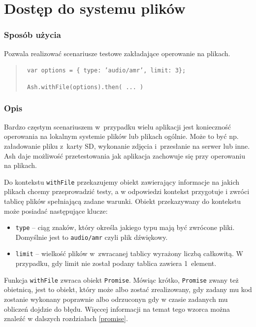 \documentclass[brudnopis]{xmgr}
\begin{document}
\section{Dostęp do systemu plików}

\subsubsection{Sposób użycia}
Pozwala realizować scenariusze testowe zakładające operowanie na plikach.

\begin{quote}
  \texttt{  var options = \{ type: 'audio/amr', limit: 3\};  }

  \texttt{  Ash.withFile(options).then( ... )  }
\end{quote}

\subsubsection{Opis}

Bardzo częstym scenariuszem w~przypadku wielu aplikacji jest konieczność operowania na lokalnym systemie plików lub plikach ogólnie. Może to być np. załadowanie pliku z~karty SD, wykonanie zdjęcia i~przesłanie na serwer lub inne. Ash daje możliwość przetestowania jak aplikacja zachowuje się przy operowaniu na plikach.  

Do kontekstu \texttt{withFile} przekazujemy obiekt zawierający informacje na jakich plikach chcemy przeprowadzić testy, a w odpowiedzi kontekst przygotuje i zwróci tablicę plików spełniającą zadane warunki. Obiekt przekazywany do kontekstu może posiadać następujące klucze:

\begin{itemize}
  \item \texttt{type} -- ciąg znaków, który określa jakiego typu mają być zwrócone pliki. Domyślnie jest to \texttt{audio/amr} czyli plik dźwiękowy. 
  \item \texttt{limit} -- wielkość plików w~zwracanej tablicy wyrażony liczbą całkowitą. W przypadku, gdy limit nie został podany tablica zawiera 1~element. 
\end{itemize}

Funkcja \texttt{withFile} zwraca obiekt \texttt{Promise}. Mówiąc krótko, \texttt{Promise} zwany też obietnicą, jest to obiekt, który może albo zostać zrealizowany, gdy zadany mu kod zostanie wykonany poprawnie albo odrzuconyn gdy w czasie zadanych mu obliczeń dojdzie do błędu. Więccej informacji na temat tego wzorca można znaleźć w dalszych rozdziałach \ref{promise}.
\end{document}
